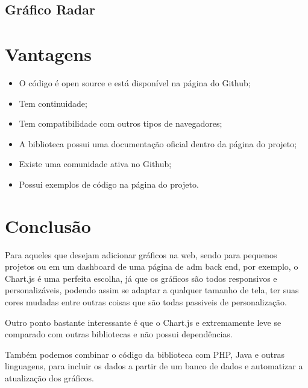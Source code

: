 \documentclass[12pt,a4paper]{article}
\begin{document}
\subsection{Gráfico Radar}


\section{Vantagens}
\begin{itemize}
\item O código é open source e está disponível na página do Github;
\item Tem continuidade;
\item Tem compatibilidade com outros tipos de navegadores;
\item A biblioteca possui uma documentação oficial dentro da página do projeto;
\item Existe uma comunidade ativa no Github;
\item Possui exemplos de código na página do projeto.
\end{itemize}

\section{Conclusão}
Para aqueles que desejam adicionar gráficos na web, sendo para pequenos projetos ou em um dashboard de uma página de adm back end, por exemplo, o Chart.js é uma perfeita escolha, já que os gráficos são todos responsivos e personalizáveis, podendo assim se adaptar a qualquer tamanho de tela, ter suas cores mudadas entre outras coisas que são todas passiveis de personalização. 
	
Outro ponto bastante interessante é que o Chart.js e extremamente leve se comparado com outras bibliotecas e não possui dependências. 

Também podemos combinar o código da biblioteca com PHP, Java e outras linguagens, para incluir os dados a partir de um banco de dados e automatizar a atualização dos gráficos.
\end{document}

